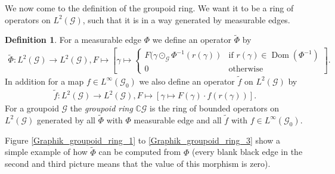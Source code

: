 \documentclass[12pt,a4paper]{scrartcl}
\theoremstyle{plain}
\theoremstyle{definition}
\newtheorem{Definition}[Theorem]{Definition}
\newcommand{\C}{\mathbb{C}} %
\newcommand{\2}{\mathbb{Z} / 2 \mathbb{Z}}
\newcommand{\G}{\mathcal{G}}
\newcommand{\1}{\bar{1}}
\newcommand{\0}{\bar{0}}
\newcommand{\Dom}{\operatorname{Dom}}
\begin{document}
We now come to the definition of the groupoid ring. We want it to be a ring of operators on	$L^2(\G)$, such that it is in a way generated by measurable edges.
\begin{Definition}\label{groupoid_ring}
	For a measurable edge $\Phi$ we define an operator $\tilde \Phi$ by
	\begin{align*}
	\tilde \Phi\colon L^2(\G) \to L^2(\G), F \mapsto \left[\gamma \mapsto \begin{cases}
	F(\gamma \odot_{\G} \Phi^{-1}(r(\gamma)) & \text{if } r(\gamma) \in \Dom(\Phi^{-1}) \\
	0 & \text{otherwise}
	\end{cases} \right] .
	\end{align*}
	In addition for a map $f \in L^\infty (\G_0)$ we also define an operator $\tilde f$ on $L^2(\G)$ by
	\begin{align*}
	\tilde f\colon L^2(\G) \to L^2(\G), F \mapsto [\gamma \mapsto F(\gamma) \cdot f(r(\gamma))].
	\end{align*}
	For a groupoid $\G$ the \emph{groupoid ring} $\C\G$ is the ring of bounded operators on $L^2(\G)$ generated by all $\tilde{\Phi}$ with $\Phi$ measurable edge and all $\tilde{f}$ with $f \in L^\infty(\G_0)$.
\end{Definition}
Figure \ref{Graphik_groupoid_ring_1} to \ref{Graphik_groupoid_ring_3} show a simple example of how $\tilde{\Phi}$ can be computed from $\Phi$ (every blank black edge in the second and third picture means that the value of this morphism is zero).
\end{document}
